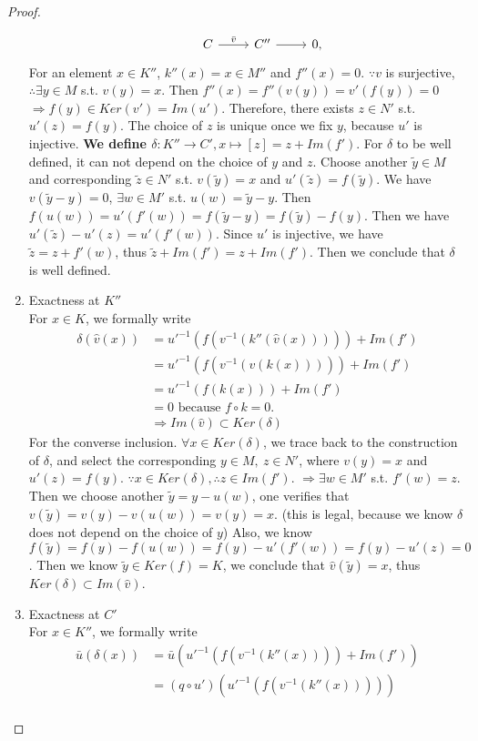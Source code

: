 \documentclass[11pt]{article}
\newcommand{\Lrta}{\Longrightarrow}
\newcommand{\lrta}{\longrightarrow}
\begin{document}
\begin{proof}
\begin{enumerate}
\[\begin{tikzcd}
& C\arrow[r,"\bar{v}"] 
& C''\arrow[r]  
& 0,
\end{tikzcd}
\]
For an element $x\in K''$, $k''(x)=x\in M''$ and $f''(x)=0$. $\because v$ is surjective, $\therefore \exists y\in M $ s.t. $v(y)=x$. Then $f''(x)=f''(v(y))=v'(f(y))=0$ $\Lrta f(y)\in Ker(v')=Im(u')$. Therefore, there exists $z\in N'$ s.t. $u'(z)=f(y)$. The choice of $z$ is unique once we fix $y$, because $u'$ is injective. \textbf{We define $\delta:K''\lrta C', x\mapsto [z]=z+Im(f')$}. For $\delta$ to be well defined, it can not depend on the choice of $y$ and $z$. Choose another $\tilde{y}\in M$ and corresponding $\tilde{z}\in N'$ s.t. $v(\tilde{y})=x$ and $u'(\tilde{z})=f(\tilde{y})$. We have $v(\tilde{y}-y)=0$, $\exists w\in M'$ s.t. $u(w)=\tilde{y}-y$. Then $f(u(w))=u'(f'(w))=f(\tilde{y}-y)=f(\tilde{y})-f(y)$. Then we have $u'(\tilde{z})-u'(z)=u'(f'(w))$. Since $u'$ is injective, we have $\tilde{z}=z+f'(w)$, thus $\tilde{z}+Im(f')=z+Im(f')$.  Then we conclude that $\delta$ is well defined.
\item Exactness at $K''$\\
For $x\in K$, we formally write
$$
\begin{aligned}
\delta(\hat{v}(x))&=u'^{-1}(f(v^{-1}(k''(\hat{v}(x)))))+Im(f')\\
&=u'^{-1}(f(v^{-1}(v(k(x)))))+Im(f')\\
&=u'^{-1}(f(k(x)))+Im(f')\\
&=0 \text{ because } f\circ k=0.\\
&\Lrta Im(\hat{v})\subset Ker(\delta)
\end{aligned}
$$
For the converse inclusion. $\forall x\in Ker(\delta)$, we trace back to the construction of $\delta$, and select the corresponding $y\in M,\ z\in N'$, where $v(y)=x$ and $u'(z)=f(y)$. $\because x\in Ker(\delta),\therefore z\in Im(f')$. $\Lrta \exists w\in M'$ s.t. $f'(w)=z$. Then we choose another $\tilde{y}=y-u(w)$, one verifies that $v(\tilde{y})=v(y)-v(u(w))=v(y)=x$. (this is legal, because we know $\delta$ does not depend on the choice of $y$) Also, we know $f(\tilde{y})=f(y)-f(u(w))=f(y)-u'(f'(w))=f(y)-u'(z)=0$. Then we know $\tilde{y}\in Ker(f)=K$, we conclude that $\hat{v}(\tilde{y})=x$, thus $Ker(\delta)\subset Im(\hat{v})$.
\item Exactness at $C'$\\
For $x\in K''$, we formally write
$$
\begin{aligned}
\bar{u}(\delta(x))&=\bar{u}\left(u'^{-1}(f(v^{-1}(k''(x))))+Im(f')\right)\\
&=(q\circ u')\left(u'^{-1}(f(v^{-1}(k''(x))))\right)\\

\end{aligned}$$
\end{enumerate}
\end{proof}
\end{document}
